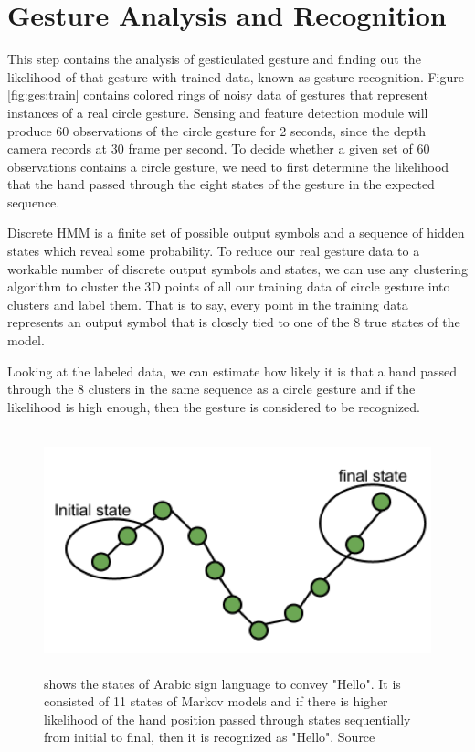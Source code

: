 \section{Gesture Analysis and Recognition}
This step contains the analysis of gesticulated gesture and finding out the likelihood of that gesture with trained data, known as gesture recognition. Figure \ref{fig:ges:train}  contains colored rings of noisy data of gestures that represent instances of a real circle gesture. Sensing and feature detection module will produce 60 observations of the circle gesture for 2 seconds, since the depth camera records at 30 frame per second. To decide whether a given set of 60 observations contains a circle gesture, we need to first determine the likelihood that the hand passed through the eight states of the gesture in the expected sequence.

Discrete HMM is a finite set of possible output symbols and a sequence of hidden states which reveal some probability. To reduce our real gesture data to a workable number of discrete output symbols and states, we can use any clustering algorithm to cluster the 3D points of all our training data of circle gesture into clusters and label them. That is to say, every point in the training data represents an output symbol that is closely tied to one of the 8 true states of the model.

Looking at the labeled data, we can estimate how likely it is that a hand passed through the 8 clusters in the same sequence as a circle gesture and if the likelihood is high enough, then the gesture is considered to be recognized.

\begin{figure}
	[h] \centering 
	\includegraphics[height=7cm]{figures/ges-rec.png} \caption{shows the states of Arabic sign language to convey "Hello". It is consisted of 11 states of Markov models and if there is higher likelihood of the hand position passed through states sequentially from initial to final, then it is recognized as "Hello". Source \cite{11}} \label{fig:ges:reg} 
\end{figure}

